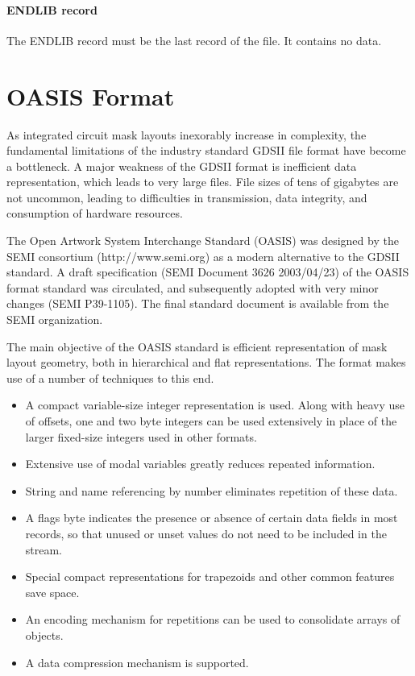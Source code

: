 \paragraph{{\vt ENDLIB} record}

The {\vt ENDLIB} record must be the last record of the file.  It
contains no data.


\section{OASIS Format}

As integrated circuit mask layouts inexorably increase in complexity,
the fundamental limitations of the industry standard GDSII file format
have become a bottleneck.  A major weakness of the GDSII format is
inefficient data representation, which leads to very large files. 
File sizes of tens of gigabytes are not uncommon, leading to
difficulties in transmission, data integrity, and consumption of
hardware resources.

The Open Artwork System Interchange Standard (OASIS) was designed by
the SEMI consortium ({\vt http://www.semi.org}) as a modern
alternative to the GDSII standard.  A draft specification (SEMI
Document 3626 2003/04/23) of the OASIS format standard was circulated,
and subsequently adopted with very minor changes (SEMI P39-1105).  The
final standard document is available from the SEMI organization.

The main objective of the OASIS standard is efficient representation
of mask layout geometry, both in hierarchical and flat
representations.  The format makes use of a number of techniques to
this end.

\begin{itemize}
\item{A compact variable-size integer representation is used.  Along
with heavy use of offsets, one and two byte integers can be used
extensively in place of the larger fixed-size integers used in other
formats.}

\item{Extensive use of modal variables greatly reduces repeated
information.}

\item{String and name referencing by number eliminates repetition of
these data.}

\item{A flags byte indicates the presence or absence of certain data
fields in most records, so that unused or unset values do not need
to be included in the stream.}

\item{Special compact representations for trapezoids and other
common features save space.}

\item{An encoding mechanism for repetitions can be used to
consolidate arrays of objects.}

\item{A data compression mechanism is supported.}
\end{itemize}

